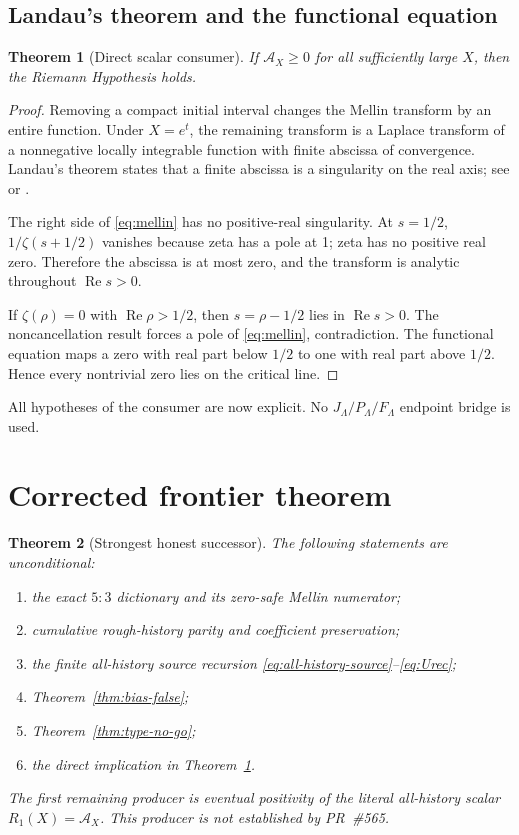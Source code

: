 \documentclass[11pt]{article}
\newtheorem{theorem}{Theorem}[section]
\newcommand{\Ree}{\operatorname{Re}}
\newcommand{\Ann}{\mathcal A}
\begin{document}
\subsection{Landau's theorem and the functional equation}
\begin{theorem}[Direct scalar consumer]\label{thm:consumer}
If $\Ann_X\ge0$ for all sufficiently large $X$, then the Riemann Hypothesis holds.
\end{theorem}

\begin{proof}
Removing a compact initial interval changes the Mellin transform by an entire function.  Under $X=e^t$, the remaining transform is a Laplace transform of a nonnegative locally integrable function with finite abscissa of convergence.  Landau's theorem states that a finite abscissa is a singularity on the real axis; see \cite[Ch.~II]{titchmarsh} or \cite{landau1905}.

The right side of \eqref{eq:mellin} has no positive-real singularity.  At $s=1/2$, $1/\zeta(s+1/2)$ vanishes because zeta has a pole at 1; zeta has no positive real zero.  Therefore the abscissa is at most zero, and the transform is analytic throughout $\Ree s>0$.

If $\zeta(\rho)=0$ with $\Ree\rho>1/2$, then $s=\rho-1/2$ lies in $\Ree s>0$.  The noncancellation result forces a pole of \eqref{eq:mellin}, contradiction.  The functional equation maps a zero with real part below $1/2$ to one with real part above $1/2$.  Hence every nontrivial zero lies on the critical line.
\end{proof}

All hypotheses of the consumer are now explicit.  No $J_\Lambda/P_\Lambda/F_\Lambda$ endpoint bridge is used.

\section{Corrected frontier theorem}

\begin{theorem}[Strongest honest successor]\label{thm:frontier}
The following statements are unconditional:
\begin{enumerate}[label=(\alph*)]
\item the exact $5{:}3$ dictionary and its zero-safe Mellin numerator;
\item cumulative rough-history parity and coefficient preservation;
\item the finite all-history source recursion \eqref{eq:all-history-source}--\eqref{eq:Urec};
\item Theorem~\ref{thm:bias-false};
\item Theorem~\ref{thm:type-no-go};
\item the direct implication in Theorem~\ref{thm:consumer}.
\end{enumerate}
The first remaining producer is eventual positivity of the literal all-history scalar $R_1(X)=\Ann_X$.  This producer is not established by PR~\#565.
\end{theorem}
\end{document}
